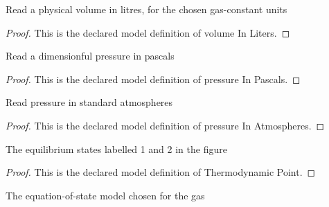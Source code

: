 \begin{definition}
  \label{def:physics:phyx-mini-0361:phyxminiproblems-problemphyxmini0361-volumeinliters}
  Read a physical volume in litres, for the chosen gas-constant units
\end{definition}
\begin{proof}
  This is the declared model definition of volume In Liters.
\end{proof}
\begin{definition}
  \label{def:physics:phyx-mini-0361:phyxminiproblems-problemphyxmini0361-pressureinpascals}
  Read a dimensionful pressure in pascals
\end{definition}
\begin{proof}
  This is the declared model definition of pressure In Pascals.
\end{proof}
\begin{definition}
  \label{def:physics:phyx-mini-0361:phyxminiproblems-problemphyxmini0361-pressureinatmospheres}
  Read pressure in standard atmospheres
\end{definition}
\begin{proof}
  This is the declared model definition of pressure In Atmospheres.
\end{proof}
\begin{definition}
  \label{def:physics:phyx-mini-0361:phyxminiproblems-problemphyxmini0361-thermodynamicpoint}
  The equilibrium states labelled 1 and 2 in the figure
\end{definition}
\begin{proof}
  This is the declared model definition of Thermodynamic Point.
\end{proof}
\begin{definition}
  \label{def:physics:phyx-mini-0361:phyxminiproblems-problemphyxmini0361-gasmodel}
  The equation-of-state model chosen for the gas
\end{definition}
